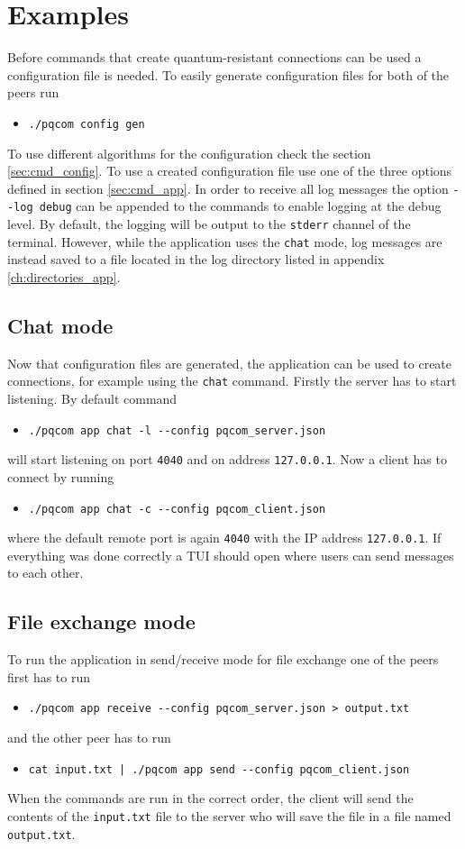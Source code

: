 \section{Examples}
Before commands that create quantum-resistant connections can be used a configuration file is needed. To easily generate configuration files for both of the peers run
\begin{itemize}
  \item \texttt{./pqcom config gen}
\end{itemize}
To use different algorithms for the configuration check the section \ref{sec:cmd_config}. To use a created configuration file use one of the three options defined in section \ref{sec:cmd_app}. In order to receive all log messages the option \texttt{-\--log debug} can be appended to the commands to enable logging at the debug level. By default, the logging will be output to the \texttt{stderr} channel of the terminal. However, while the application uses the \texttt{chat} mode, log messages are instead saved to a file located in the log directory listed in appendix \ref{ch:directories_app}.

\subsection{Chat mode}
Now that configuration files are generated, the application can be used to create connections, for example using the \texttt{chat} command. Firstly the server has to start listening. By default command
\begin{itemize}
  \item \texttt{./pqcom app chat -l -\--config pqcom\_server.json}
\end{itemize}
will start listening on port \texttt{4040} and on address \texttt{127.0.0.1}. Now a client has to connect by running
\begin{itemize}
  \item \texttt{./pqcom app chat -c -\--config pqcom\_client.json}
\end{itemize}
where the default remote port is again \texttt{4040} with the IP address \texttt{127.0.0.1}. If everything was done correctly a TUI should open where users can send messages to each other.

\subsection{File exchange mode}
To run the application in send/receive mode for file exchange one of the peers first has to run
\begin{itemize}
  \item \texttt{./pqcom app receive -\--config pqcom\_server.json > output.txt}
\end{itemize}
and the other peer has to run
\begin{itemize}
  \item \texttt{cat input.txt | ./pqcom app send -\--config pqcom\_client.json}
\end{itemize}
When the commands are run in the correct order, the client will send the contents of the \texttt{input.txt} file to the server who will save the file in a file named \texttt{output.txt}.

